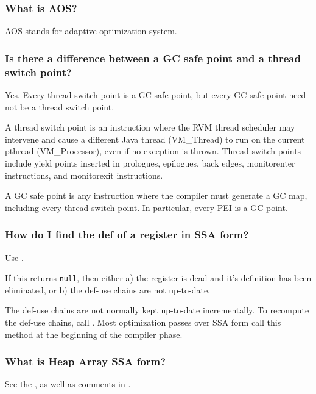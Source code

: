 \subsubsection{What is AOS?}
AOS stands for adaptive optimization system.

\subsubsection{Is there a difference between a GC safe point and a thread
switch point?}

Yes.  Every thread switch point is a GC safe point, but every GC safe point 
need not be a thread switch point.

A thread switch point is an instruction where the RVM thread scheduler may
intervene and cause a different Java\TMweb{} thread (VM\_Thread) to
run on the current 
pthread (VM\_Processor), even if no exception is thrown.  
Thread switch points include yield points inserted in prologues, epilogues, 
back edges, {\instruction monitorenter} instructions, and
{\instruction monitorexit} instructions.

A GC safe point is any instruction where the compiler must generate a GC map, 
including every thread switch point.  In particular, every 
PEI is a GC point.

\subsubsection{How do I find the def of a register in SSA form?}

Use 
.

If this returns {\tt null}, then either a) the register is dead and it's definition has been eliminated, 
or b) the def-use chains are not up-to-date.

The def-use chains are not normally kept up-to-date incrementally.  To
recompute the def-use chains, call 
. 
Most optimization passes over SSA form call this method at 
the beginning of the compiler phase.

\subsubsection{What is Heap Array SSA form?}
See the , as well as comments in
.

